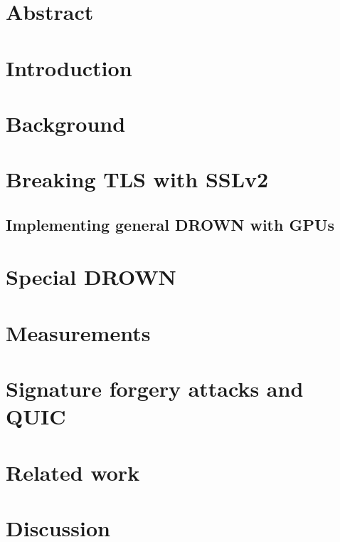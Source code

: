 \newcommand{\DrownPaper}{papers/drown/paper}
\newcommand{\DrownFigures}{papers/drown/figures}



\section*{Abstract}


\section{Introduction}


\section{Background}


\section{Breaking TLS with SSLv2}


\subsection{Implementing general DROWN with GPUs} 


\section{Special DROWN}


\section{Measurements}


\section{Signature forgery attacks and QUIC}


\section{Related work}


\section{Discussion}


